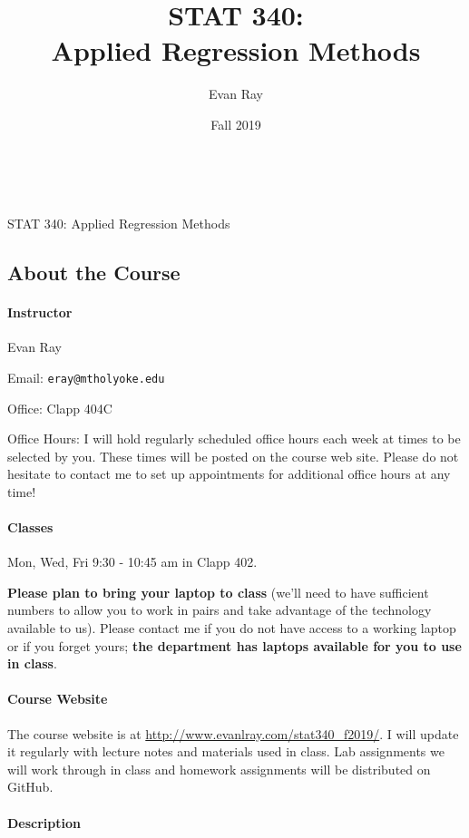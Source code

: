 \documentclass[11pt]{article}
\title{STAT 340:\\Applied Regression Methods}
\author{Evan Ray}
\date{Fall 2019}
\begin{document}

\ \\
\vspace{.01in}
\begin{center}
{\large STAT 340: Applied Regression Methods}
\end{center}
\subsection*{About the Course}

\paragraph{Instructor}

Evan Ray

Email: \texttt{eray@mtholyoke.edu}

Office: Clapp 404C

Office Hours: I will hold regularly scheduled office hours each week at times to be selected by you.  These times will be posted on the course web site.  Please do not hesitate to contact me to set up appointments for additional office hours at any time!

\paragraph{Classes} \mbox{}

Mon, Wed, Fri 9:30 - 10:45 am in Clapp 402.

\textbf{Please plan to bring your laptop to class} (we'll need to have sufficient numbers to allow you to work in pairs and take advantage of the technology available to us).  Please contact me if you do not have access to a working laptop or if you forget yours; \textbf{the department has laptops available for you to use in class}.

\paragraph{Course Website}
The course website is at \url{http://www.evanlray.com/stat340_f2019/}.  I will update it regularly with lecture notes and materials used in class.  Lab assignments we will work through in class and homework assignments will be distributed on GitHub.

\paragraph{Description}
\end{document}
